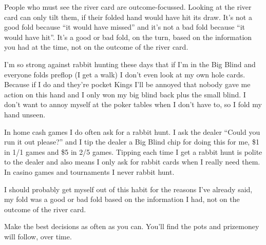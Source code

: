 People who must see the river card are outcome-focussed. Looking
at the river card can only tilt them, if their folded hand would
have hit its draw. It's not a good fold because ``it would have
missed'' and it's not a bad fold because ``it would have hit''. It's
a good or bad fold, on the turn, based on the information you
had at the time, not on the outcome of the river card.

I'm so strong against rabbit hunting these days that if I'm in the
Big Blind and everyone folds preflop (I get a walk) I don't even look
at my own hole cards. Because if I do and they're pocket Kings I'll be
annoyed that nobody gave me action on this hand and I only won my big
blind back plus the small blind. I don't want to annoy myself at the
poker tables when I don't have to, so I fold my hand unseen.

In home cash games I do often ask for a rabbit hunt. I ask the
dealer ``Could you run it out please?'' and I tip the dealer a Big
Blind chip for doing this for me, \$1 in 1/1 games and \$5 in 2/5
games. Tipping each time I get a rabbit hunt is polite to the dealer
and also means I only ask for rabbit cards when I really need them. In
casino games and tournaments I never rabbit hunt.

I should probably get myself out of this habit for the reasons I've
already said, my fold was a good or bad fold based on the information
I had, not on the outcome of the river card.


Make the best decisions as often as you can. You'll find the pots
and prizemoney will follow, over time.
